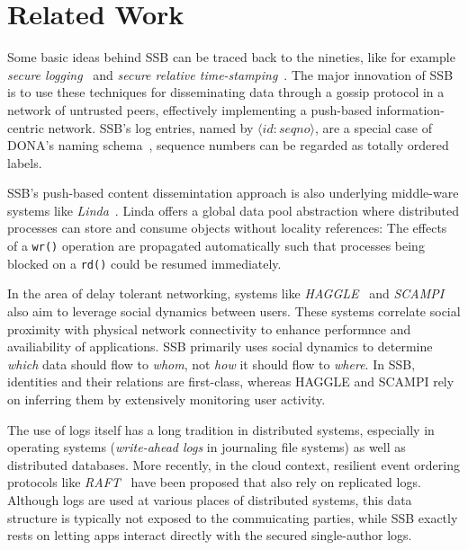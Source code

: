 \documentclass[9pt,sigconf,rewiew]{acmart}
\begin{document}
\section{Related Work}
\label{sect:relwork}

Some basic ideas behind SSB can be traced back to the nineties, like
for example {\em secure logging}~\cite{schneier1998cryptographic} and {\em secure
relative time-stamping}~\cite{haber1990time}. The major innovation of
SSB is to use these techniques for disseminating data through a gossip
protocol in a network of untrusted peers, effectively implementing a
push-based information-centric network. SSB's log entries, named by $\langle id:seqno\rangle$, are a special case of DONA's naming schema~\cite{Koponen:2007:DNA:1282380.1282402}, sequence numbers can be regarded as totally ordered labels.

SSB's push-based content dissemintation approach is also
underlying middle-ware systems like
{\em Linda}~\cite{Gelernter:1985:GCL:2363.2433}. Linda offers a global data
pool abstraction where distributed processes can store and consume
objects without locality references: The effects of a {\tt wr()}
operation are propagated automatically such that processes being
blocked on a {\tt rd()} could be resumed immediately.

In the area of delay tolerant networking, systems like {\em HAGGLE}~\cite{scott2006haggle} and {\em SCAMPI}~\cite{pitkanen2012scampi} also aim to leverage social dynamics between users. These systems correlate social proximity with physical network connectivity to enhance performnce and availiability of applications. SSB primarily uses social dynamics to determine {\em which} data should flow to {\em whom}, not {\em how} it should flow to {\em where}. In SSB, identities and their relations are first-class, whereas HAGGLE and SCAMPI rely on inferring them by extensively monitoring user activity.

The use of logs itself has a long tradition in distributed systems,
especially in operating systems ({\em write-ahead logs} in journaling file
systems) as well as distributed databases. More recently, in the cloud
context, resilient event ordering protocols like
{\em RAFT}~\cite{DBLP:conf/usenix/OngaroO14} have been proposed that also
rely on replicated logs. Although logs are used at various places of
distributed systems, this data structure is typically not exposed to
the commuicating parties, while SSB exactly rests on letting apps
interact directly with the secured single-author logs.
\end{document}
